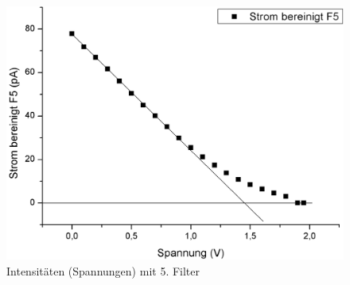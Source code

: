 \documentclass[12pt,a4paper]{article}
\begin{document}
\begin{figure}[H]
	\centering
	\includegraphics[scale=0.5]{./data/Filter5.png}
	\caption{Intensitäten (Spannungen) mit 5. Filter}
	\label{fig:filter5}
\end{figure}
\end{document}
